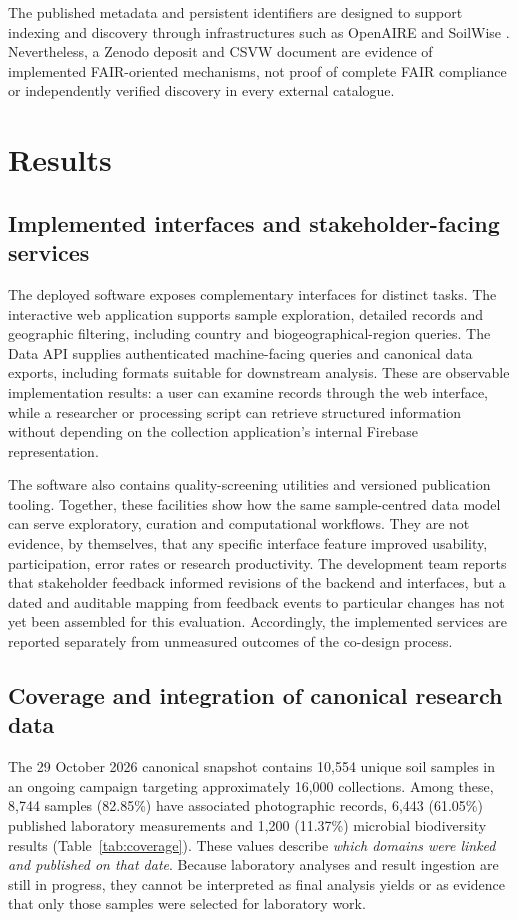 \documentclass[11pt,a4paper]{article}
\begin{document}
The published metadata and persistent identifiers are designed to support indexing and discovery through infrastructures such as OpenAIRE and SoilWise \parencite{soilwise2026faq}. Nevertheless, a Zenodo deposit and CSVW document are evidence of implemented FAIR-oriented mechanisms, not proof of complete FAIR compliance or independently verified discovery in every external catalogue.

\section{Results}
\subsection{Implemented interfaces and stakeholder-facing services}
The deployed software exposes complementary interfaces for distinct tasks. The interactive web application supports sample exploration, detailed records and geographic filtering, including country and biogeographical-region queries. The Data API supplies authenticated machine-facing queries and canonical data exports, including formats suitable for downstream analysis. These are observable implementation results: a user can examine records through the web interface, while a researcher or processing script can retrieve structured information without depending on the collection application's internal Firebase representation.

The software also contains quality-screening utilities and versioned publication tooling. Together, these facilities show how the same sample-centred data model can serve exploratory, curation and computational workflows. They are not evidence, by themselves, that any specific interface feature improved usability, participation, error rates or research productivity. The development team reports that stakeholder feedback informed revisions of the backend and interfaces, but a dated and auditable mapping from feedback events to particular changes has not yet been assembled for this evaluation. Accordingly, the implemented services are reported separately from unmeasured outcomes of the co-design process.

\subsection{Coverage and integration of canonical research data}
The 29 October 2026 canonical snapshot contains 10,554 unique soil samples in an ongoing campaign targeting approximately 16,000 collections. Among these, 8,744 samples (82.85\%) have associated photographic records, 6,443 (61.05\%) published laboratory measurements and 1,200 (11.37\%) microbial biodiversity results (Table~\ref{tab:coverage}). These values describe \emph{which domains were linked and published on that date}. Because laboratory analyses and result ingestion are still in progress, they cannot be interpreted as final analysis yields or as evidence that only those samples were selected for laboratory work.
\end{document}
